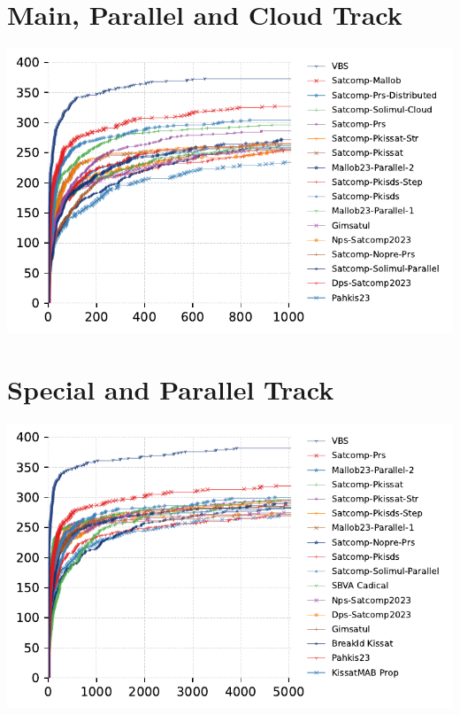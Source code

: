 \documentclass{article}
\begin{document}
\section{Main, Parallel and Cloud Track}
\includegraphics[width=\linewidth]{gen/sc2023/main-parallel-cloud/cdf.pdf}




\section{Special and Parallel Track}
\includegraphics[width=\linewidth]{gen/sc2023/special-parallel/cdf.pdf}


\end{document}
